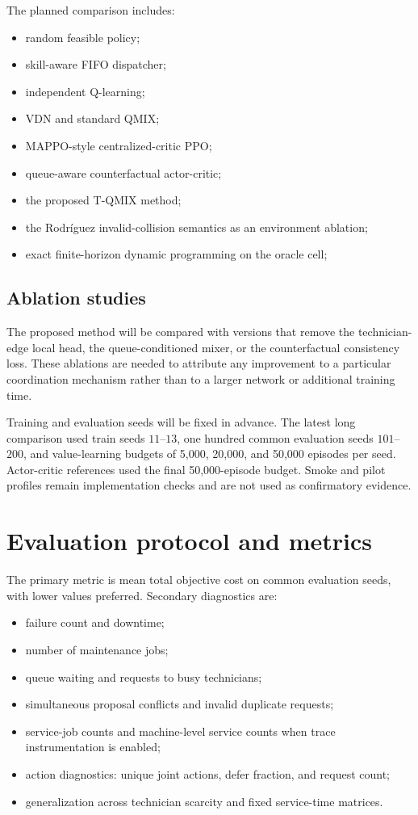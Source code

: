 \documentclass[11pt]{article}
\begin{document}
The planned comparison includes:
\begin{itemize}[leftmargin=*]
    \item random feasible policy;
    \item skill-aware FIFO dispatcher;
    \item independent Q-learning;
    \item VDN and standard QMIX;
    \item MAPPO-style centralized-critic PPO;
    \item queue-aware counterfactual actor-critic;
    \item the proposed T-QMIX method;
    \item the Rodríguez invalid-collision semantics as an environment ablation;
    \item exact finite-horizon dynamic programming on the oracle cell;
\end{itemize}

\subsection{Ablation studies}

The proposed method will be compared with versions that remove the technician-edge local head, the queue-conditioned mixer, or the counterfactual consistency loss. These ablations are needed to attribute any improvement to a particular coordination mechanism rather than to a larger network or additional training time.

Training and evaluation seeds will be fixed in advance. The latest long comparison used train seeds $11$--$13$, one hundred common evaluation seeds $101$--$200$, and value-learning budgets of 5,000, 20,000, and 50,000 episodes per seed. Actor-critic references used the final 50,000-episode budget. Smoke and pilot profiles remain implementation checks and are not used as confirmatory evidence.

\section{Evaluation protocol and metrics}

The primary metric is mean total objective cost on common evaluation seeds, with lower values preferred. Secondary diagnostics are:

\begin{itemize}[leftmargin=*]
    \item failure count and downtime;
    \item number of maintenance jobs;
    \item queue waiting and requests to busy technicians;
    \item simultaneous proposal conflicts and invalid duplicate requests;
    \item service-job counts and machine-level service counts when trace instrumentation is enabled;
    \item action diagnostics: unique joint actions, defer fraction, and request count;
    \item generalization across technician scarcity and fixed service-time matrices.
\end{itemize}
\end{document}
